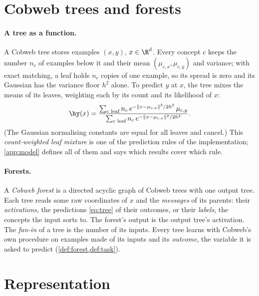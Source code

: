 \section{Cobweb trees and forests}\label{sec:forests}

\paragraph{A tree as a function.}
A Cobweb tree stores examples $(x,y)$, $x\in\R^d$.  Every concept $c$ keeps the number
$n_c$ of examples below it and their mean $(\mu_{c,x},\mu_{c,y})$ and variance; with exact
matching, a leaf holds $n_c$ copies of one example, so its spread is zero and its Gaussian
has the variance floor $h^2$ alone.  To predict $y$ at $x$, the tree mixes the means of its
leaves, weighting each by its count and its likelihood of $x$:
\begin{equation}\label{eq:tree}
  \hy(x)=\frac{\sum_{c\text{ leaf}}n_c\,e^{-\|x-\mu_{c,x}\|^2/2h^2}\,\mu_{c,y}}
              {\sum_{c\text{ leaf}}n_c\,e^{-\|x-\mu_{c,x}\|^2/2h^2}}.
\end{equation}
(The Gaussian normalising constants are equal for all leaves and cancel.)  This
\emph{count-weighted leaf mixture} is one of the prediction rules of the implementation;
\cref{app:model} defines all of them and says which results cover which rule.

\paragraph{Forests.}
A \emph{Cobweb forest} is a directed acyclic graph of Cobweb trees with one output tree.
Each tree reads some raw coordinates of $x$ and the \emph{messages} of its parents: their
\emph{activations}, the predictions \eqref{eq:tree} of their outcomes, or their
\emph{labels}, the concepts the input sorts to.  The forest's output is the output tree's
activation.  The \emph{fan-in} of a tree is the number of its inputs.  Every tree learns
with Cobweb's own procedure on examples made of its inputs and its \emph{outcome}, the
variable it is asked to predict (\cref{def:forest,def:task}).

\section{Representation}\label{sec:repr-main}

